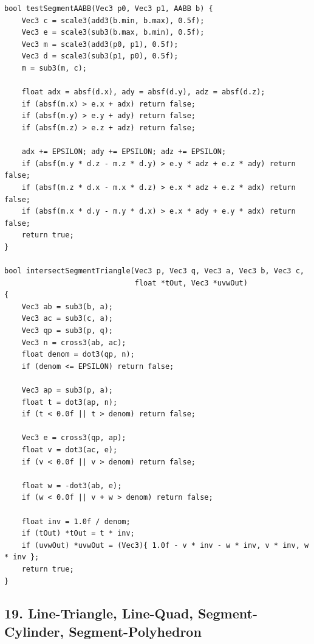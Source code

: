 \documentclass[10pt,letterpaper]{article}
\begin{document}
\begin{verbatim}
bool testSegmentAABB(Vec3 p0, Vec3 p1, AABB b) {
    Vec3 c = scale3(add3(b.min, b.max), 0.5f);
    Vec3 e = scale3(sub3(b.max, b.min), 0.5f);
    Vec3 m = scale3(add3(p0, p1), 0.5f);
    Vec3 d = scale3(sub3(p1, p0), 0.5f);
    m = sub3(m, c);

    float adx = absf(d.x), ady = absf(d.y), adz = absf(d.z);
    if (absf(m.x) > e.x + adx) return false;
    if (absf(m.y) > e.y + ady) return false;
    if (absf(m.z) > e.z + adz) return false;

    adx += EPSILON; ady += EPSILON; adz += EPSILON;
    if (absf(m.y * d.z - m.z * d.y) > e.y * adz + e.z * ady) return false;
    if (absf(m.z * d.x - m.x * d.z) > e.x * adz + e.z * adx) return false;
    if (absf(m.x * d.y - m.y * d.x) > e.x * ady + e.y * adx) return false;
    return true;
}

bool intersectSegmentTriangle(Vec3 p, Vec3 q, Vec3 a, Vec3 b, Vec3 c,
                              float *tOut, Vec3 *uvwOut)
{
    Vec3 ab = sub3(b, a);
    Vec3 ac = sub3(c, a);
    Vec3 qp = sub3(p, q);
    Vec3 n = cross3(ab, ac);
    float denom = dot3(qp, n);
    if (denom <= EPSILON) return false;

    Vec3 ap = sub3(p, a);
    float t = dot3(ap, n);
    if (t < 0.0f || t > denom) return false;

    Vec3 e = cross3(qp, ap);
    float v = dot3(ac, e);
    if (v < 0.0f || v > denom) return false;

    float w = -dot3(ab, e);
    if (w < 0.0f || v + w > denom) return false;

    float inv = 1.0f / denom;
    if (tOut) *tOut = t * inv;
    if (uvwOut) *uvwOut = (Vec3){ 1.0f - v * inv - w * inv, v * inv, w * inv };
    return true;
}
\end{verbatim}


\subsection*{19. Line-Triangle, Line-Quad, Segment-Cylinder, Segment-Polyhedron}
\end{document}
